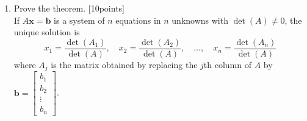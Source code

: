 \documentclass[12pt, a4paper]{article}
\begin{document}
\begin{enumerate}
    \item Prove the theorem. [10points] \\
    If $A\mathbf{x}=\mathbf{b}$ is a system of $n$ equations in $n$ unknowns with $\det(A)\neq 0$,
the unique solution is
\[
x_1=\frac{\det(A_1)}{\det(A)},\quad
x_2=\frac{\det(A_2)}{\det(A)},\quad\ldots,\quad
x_n=\frac{\det(A_n)}{\det(A)}
\]
where $A_j$ is the matrix obtained by replacing the $j$th column of $A$ by
$\mathbf{b}=\begin{bmatrix}b_1\\b_2\\\vdots\\b_n\end{bmatrix}$. \\ \\ \\ \\ \\ \\ \\ \\


\end{enumerate}
\end{document}

